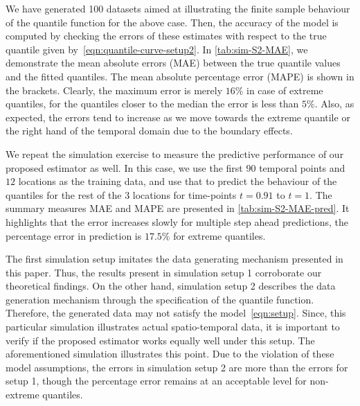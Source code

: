 \documentclass[aos]{imsart}
\theoremstyle{plain}
\theoremstyle{remark}
\newcommand{\sd}[1]{ {\color{red}{ [\textbf{SD:} {#1}] }}}
\newcommand{\srcomment}[1]{ {\color{myblue}{ [\textbf{SR:} \textit{#1} ] }}}
\begin{document}
We have generated 100 datasets aimed at illustrating the finite sample behaviour of the quantile function for the above case. Then, the accuracy of the model is computed by checking the errors of these estimates with respect to the true quantile given by~\eqref{eqn:quantile-curve-setup2}. In \cref{tab:sim-S2-MAE}, we demonstrate the mean absolute errors (MAE) between the true quantile values and the fitted quantiles. The mean absolute percentage error (MAPE) is shown in the brackets. Clearly, the maximum error is merely $16\%$ in case of extreme quantiles, for the quantiles closer to the median the error is less than $5\%$. Also, as expected, the errors tend to increase as we move towards the extreme quantile or the right hand of the temporal domain due to the boundary effects.

We repeat the simulation exercise to measure the predictive performance of our proposed estimator as well. In this case, we use the first $90$ temporal points and $12$ locations as the training data, and use that to predict the behaviour of the quantiles for the rest of the $3$ locations for time-points $t = 0.91$ to $t = 1$. The summary measures MAE and MAPE are presented in \cref{tab:sim-S2-MAE-pred}. It highlights that the error increases slowly for multiple step ahead predictions, the percentage error in prediction is $17.5\%$ for extreme quantiles.





The first simulation setup imitates the data generating mechanism presented in this paper. Thus, the results present in simulation setup 1 corroborate our theoretical findings. On the other hand, simulation setup 2 describes the data generation mechanism through the specification of the quantile function. Therefore, the generated data may not satisfy the model~\eqref{eqn:setup}. Since, this particular simulation illustrates actual spatio-temporal data, it is important to verify if the proposed estimator works equally well under this setup. The aforementioned simulation illustrates this point. Due to the violation of these model assumptions, the errors in simulation setup 2 are more than the errors for setup 1, though the percentage error remains at an acceptable level for non-extreme quantiles.
\end{document}
